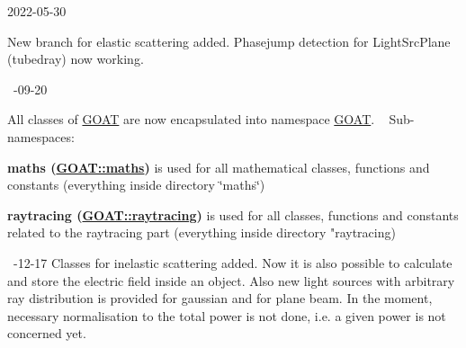 2022-\/05-\/30 

New branch for elastic scattering added. Phasejump detection for Light\+Src\+Plane (tubedray) now working. 

~-\/09-\/20 

All classes of \mbox{\hyperlink{namespace_g_o_a_t}{GOAT}} are now encapsulated into namespace \mbox{\hyperlink{namespace_g_o_a_t}{GOAT}}. ~\newline
 Sub-\/namespaces\+: ~\newline
 
\begin{DoxyItemize}
\item {\bfseries{maths (\mbox{\hyperlink{namespace_g_o_a_t_1_1maths}{GOAT\+::maths}})}} is used for all mathematical classes, functions and constants (everything inside directory \char`\"{}maths\char`\"{})  
\item {\bfseries{raytracing (\mbox{\hyperlink{namespace_g_o_a_t_1_1raytracing}{GOAT\+::raytracing}})}} is used for all classes, functions and constants related to the raytracing part (everything inside directory "{}raytracing)  
\end{DoxyItemize}

~-\/12-\/17 Classes for inelastic scattering added. Now it is also possible to calculate and store the electric field inside an object. Also new light sources with arbitrary ray distribution is provided for gaussian and for plane beam. In the moment, necessary normalisation to the total power is not done, i.\+e. a given power is not concerned yet. 